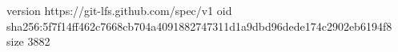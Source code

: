 version https://git-lfs.github.com/spec/v1
oid sha256:5f7f14ff462c7668cb704a4091882747311d1a9dbd96dede174c2902eb6194f8
size 3882
